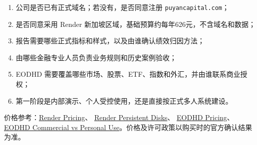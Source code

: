 \documentclass[11pt,a4paper]{ctexart}
\begin{document}
\begin{enumerate}[leftmargin=2em,itemsep=2pt]
  \item 公司是否已有正式域名；若没有，是否同意注册 \texttt{puyancapital.com}；
  \item 是否同意采用 Render 新加坡区域，基础预算约每年626元，不含域名和数据；
  \item 报告需要哪些正式指标和样式，以及由谁确认绩效归因方法；
  \item 由哪些金融专业人员负责业务规则和历史案例验收；
  \item EODHD 需要覆盖哪些市场、股票、ETF、指数和外汇，并由谁联系商业授权；
  \item 第一阶段是内部演示、个人受控使用，还是直接按正式多人系统建设。
\end{enumerate}

\vfill
\small
\noindent 价格参考：\href{https://render.com/pricing}{Render Pricing}、
\href{https://render.com/docs/disks}{Render Persistent Disks}、
\href{https://eodhd.com/pricing}{EODHD Pricing}、
\href{https://eodhd.com/financial-apis/commercial-vs-personal-license-use}{EODHD Commercial vs Personal Use}。价格及许可政策以购买时的官方确认结果为准。
\end{document}
